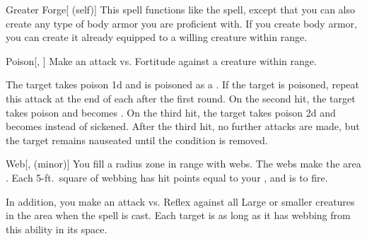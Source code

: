 \lowercase{\hypertarget{spell:Greater Forge}{}}\label{spell:Greater Forge}
\begin{attuneability}[\nth{2}]{\hypertarget{spell:Greater Forge}{Greater Forge}}[ (self)]
This spell functions like the  spell, except that you can also create any type of body armor you are proficient with.
If you create body armor, you can create it already equipped to a willing creature within range.
\end{attuneability}
\vspace{0.25em}



\lowercase{\hypertarget{spell:Poison}{}}\label{spell:Poison}
\begin{apability}[\nth{2}]{\hypertarget{spell:Poison}{Poison}}[, ]
Make an attack vs. Fortitude against a creature within \rngmed range.

\hit The target takes poison  \plus1d and is poisoned as a .
If the target is poisoned, repeat this attack at the end of each  after the first round.
On the second hit, the target takes poison  and becomes .
On the third hit, the target takes poison  \plus2d and becomes  instead of sickened.
After the third hit, no further attacks are made, but the target remains nauseated until the condition is removed.
\end{apability}
\vspace{0.25em}



\lowercase{\hypertarget{spell:Web}{}}\label{spell:Web}
\begin{apability}[\nth{2}]{\hypertarget{spell:Web}{Web}}[,  (minor)]
You fill a \areasmall radius zone in \rngclose range with webs.
The webs make the area .
Each 5-ft.\ square of webbing has hit points equal to your , and is  to fire.

In addition, you make an attack vs. Reflex against all Large or smaller creatures in the area when the spell is cast.
\hit Each target is  as long as it has webbing from this ability in its space.
\end{apability}
\vspace{0.25em}



